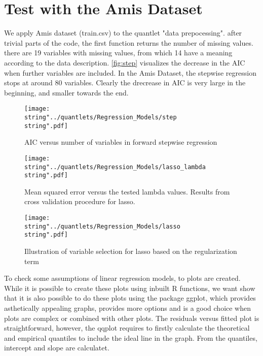 
\section{Test with the Amis Dataset}
We apply Amis dataset (train.csv) to the quantlet "data prepocessing".
after trivial parts of the code, the first function returns the number of missing values.  there are 19 variables with missing values, from which 14 have a meaning according to the data description. 
\autoref{fig:step} visualizes the decrease in the AIC when further variables are included. In the Amis Dataset, the stepwise regression stops at around 80 variables. Clearly the drecrease in AIC is very large in the beginning, and smaller towards the end. 



\begin{figure}
  \centering
\texttt{[image: \\string"../quantlets/Regression\_Models/step\\string".pdf]}
  \caption{AIC versus number of variables in forward stepwise regression}\label{fig:step}
\end{figure}


\begin{figure}
  \centering
\texttt{[image: \\string"../quantlets/Regression\_Models/lasso\_lambda\\string".pdf]}
  \caption{Mean squared error versus the tested lambda values. Results from cross validation procedure for lasso.}\label{fig:step}
\end{figure}


\begin{figure}
  \centering
\texttt{[image: \\string"../quantlets/Regression\_Models/lasso\\string".pdf]}
  \caption{Illustration of variable selection for lasso based on the regularization term}\label{fig:step}
\end{figure}






To check some assumptions of linear regression models, to plots are
created. While it is possible to create these plots using inbuilt
R functions, we want show that it is also possible to do these plots
using the package ggplot, which provides asthetically appealing graphs,
provides more options and is a good choice when plots are complex
or combined with other plots. The residuals versus fitted plot is
straightforward, however, the qqplot requires to firstly calculate
the theoretical and empirical quantiles to include the ideal line
in the graph. From the quantiles, intercept and slope are calculatet. 
